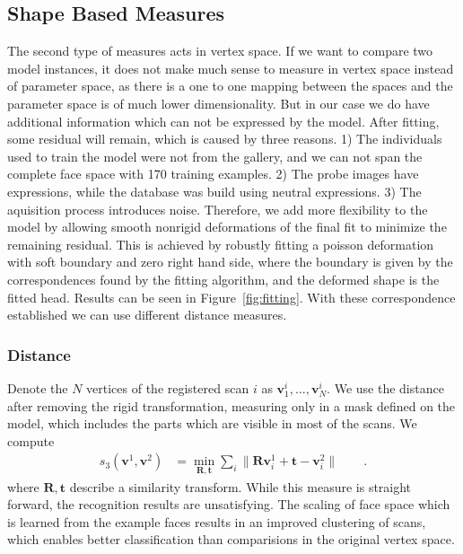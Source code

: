 \documentclass{vgtc}                          %
\newcommand*{\MAT}[1]  {\ensuremath{\mathbf{#1}}}
\newcommand*{\VEC}[1]  {\ensuremath{\bm{#1}}}
\newcommand*{\norm}[1]{\mathopen\| #1 \mathclose\|}%
\begin{document}
\subsection{Shape Based Measures}
The second type of measures acts in vertex space. If we want to compare
two model instances, it does not make much sense to measure in vertex space
instead of parameter space, as there is a one to one mapping between the spaces
and the parameter space is of much lower dimensionality. But in our case we do
have additional information which can not be expressed by the model.
After fitting, some residual will remain, which is caused by three reasons. 1)
The individuals used to train the model were not from the gallery, and we can
not span the complete face space with 170 training examples.  2) The probe
images have expressions, while the database was build using neutral expressions.
3) The aquisition process introduces noise. Therefore, we add more
flexibility to the model by allowing smooth nonrigid deformations of the final
fit to minimize the remaining residual. This is achieved by robustly fitting a
poisson deformation with soft boundary and zero right hand side, where the
boundary is given by the correspondences found by the fitting algorithm, and
the deformed shape is the fitted head.  Results can be seen in
Figure~\ref{fig:fitting}.  With these correspondence established we can use
different distance measures.

\subsubsection{Distance}
Denote the $N$ vertices of the registered scan $i$ as $\VEC v^i_1,\dots,\VEC
v^i_N$.  We use the distance after removing the rigid transformation, measuring
only in a mask defined on the model, which includes the parts which are visible
in most of the scans. We compute
\begin{align}
  s_3(\MAT v^1, \MAT v^2)  &= \min_{\MAT R,\VEC t} \sum_i \norm{\MAT R\VEC v^1_i + \VEC t - \VEC v^2_i}\qquad.
\end{align}
where $\MAT R,\VEC t$ describe a similarity transform.
%
While this measure is straight forward, the recognition results are
unsatisfying. The scaling of face space which is learned from the example faces
results in an improved clustering of scans, which enables better classification
than comparisions in the original vertex space.
\end{document}
